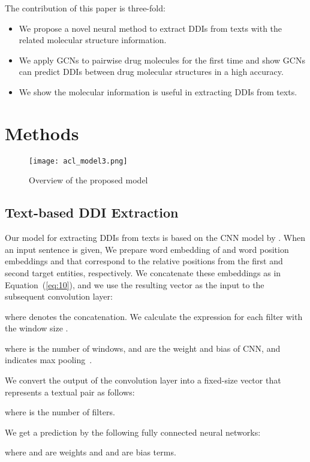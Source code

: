 \documentclass[11pt,a4paper]{article}
\begin{document}
The contribution of this paper is three-fold: 
\begin{itemize}[nolistsep]
\item{We propose a novel neural method to extract DDIs from texts with the related molecular structure information.} 
\item{We apply GCNs to pairwise drug molecules for the first time and show GCNs can predict DDIs between drug molecular structures in a high accuracy.} 
\item{We show the molecular information is useful in extracting DDIs from texts.}
\end{itemize}

\section{Methods}
\begin{figure*}[t]
  \centering
  \texttt{[image: acl\_model3.png]}
  \caption{Overview of the proposed model}\label{figure:model}
\end{figure*} 

\subsection{Text-based DDI Extraction}

Our model for extracting DDIs from texts is based on the CNN model by .
When an input sentence  is given, 
We prepare word embedding  of  and word position embeddings  and  that correspond to the relative positions from the first and second target entities, respectively. 
We concatenate these embeddings as in Equation~(\ref{eq:10}), and we use the resulting vector as the input to the subsequent convolution layer:

where  denotes the concatenation.
We calculate the expression for each filter  with the window size .

where  is the number of windows,  and  are the weight and bias of CNN, and  indicates max pooling~\cite{maxpooling}.

We convert the output of the convolution layer into a fixed-size vector that represents a textual pair as follows:

where  is the number of filters. 

We get a prediction  by the following fully connected neural networks: 

where  and  are weights and  and  are bias terms.
\end{document}
